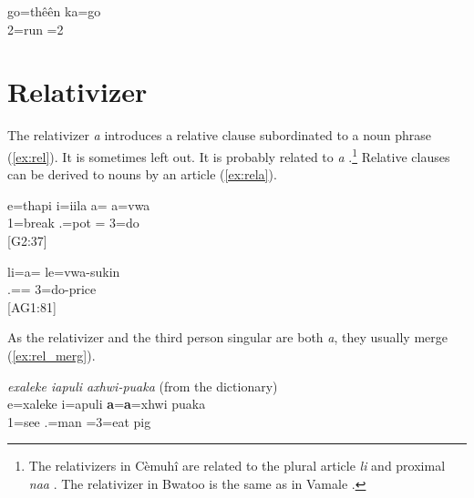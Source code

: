 \ea \label{ex:kawc}
\gll go=thêên ka=go\\
2=run =2\\
\glt {}
\z

\section{Relativizer}
\label{sec:WCREL}
The relativizer \textit{a} introduces a relative clause subordinated to a noun phrase (\ref{ex:rel}). It is sometimes left out. It is probably related to \textit{a} .\footnote{The relativizers in Cèmuhî are related to the plural article \textit{li} and proximal \textit{naa} \parencite[92]{rivierre_langue_1980}. The relativizer in Bwatoo is the same as in Vamale \parencite[473, 486]{rivierre_bwatoo_2006}.} Relative clauses can be derived to nouns by an article (\ref{ex:rela}).


\ea\label{ex:rel}
\gll e=thapi i=iila a= a=vwa\\
 1=break .=pot = 3=do\\
\glt {} {[G2:37]}
\z
 

\ea\label{ex:rela}
\gll li=a= le=vwa-sukin\\
 .== 3=do-price\\
\glt {} {[AG1:81]}
\z

As the relativizer and the third person singular are both \textit{a}, they usually merge (\ref{ex:rel_merg}). 

\ea 
\label{ex:rel_merg}
\textit{exaleke iapuli axhwi-puaka} (from the dictionary)\\
\gll e=xaleke i=apuli \textbf{a}=\textbf{a}=xhwi puaka\\
 1=see .=man =3=eat pig\\
\glt {}
\z
%
%
%
%
%



%


